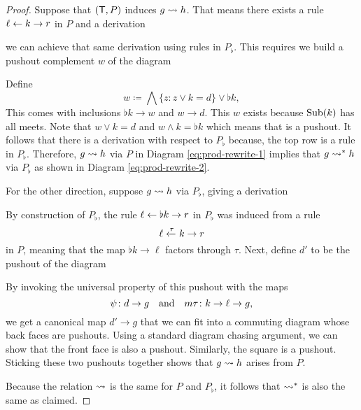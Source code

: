 \documentclass{amsart}
\begin{document}
\begin{proof}
  Suppose that $ ( \mathsf{T},P ) $ induces $ g \rightsquigarrow h $. That
  means there exists a rule $ \ell \leftarrow k \to r $ in $ P $
  and a derivation 
  
  we can achieve that same derivation using rules in
  $ P_\flat $. This requires we build a pushout complement
  $ w $ of the diagram 

  Define
  \[ w \coloneqq \bigwedge \{ z \colon z \vee k = d \} \vee
    \flat k,\] This comes with inclusions $ \flat k \to w $
  and $ w \to d $. This $ w $ exists because $ \operatorname{Sub} (k) $
  has all meets.  Note that $ w \vee k = d $ and
  $ w \wedge k = \flat k $ which means that
   is a pushout. It
  follows that there is a derivation
   with respect to
  $ P_\flat $ because, the top row is a rule in $ P_\flat $.
  Therefore, $ g \rightsquigarrow h $ via $ P $ in Diagram
  \eqref{eq:prod-rewrite-1} implies that $ g \rightsquigarrow^\ast h $
  via $ P_\flat $ as shown in Diagram
  \eqref{eq:prod-rewrite-2}.

  For the other direction, suppose $ g \rightsquigarrow h $ via
  $ P_\flat $, giving a derivation
  

  By construction of $ P_\flat $, the rule
  $ \ell \leftarrow \flat k \to r $ in $ P_\flat $ was induced from
  a rule $$\ell \xleftarrow{\tau} k \to r$$ in $ P $, meaning
  that the map $ \flat k \to \ell $ factors through
  $ \tau $. Next, define $ d' $ to be the pushout of the
  diagram 

  By invoking the universal property of this pushout with
  the maps
  \[
    \psi \colon d \to g \quad \text{and} \quad m \tau \colon k
    \to \ell \to g,
  \]
  we get a canonical map $ d' \to g $ that we can fit into a
  commuting diagram 
  whose back faces are pushouts. Using a standard diagram
  chasing argument, we can show that the front face is also
  a pushout.  Similarly, the square
   is a pushout.  Sticking
  these two pushouts together
   shows that
  $ g \rightsquigarrow h $ arises from $ P $.

  Because the relation $ \rightsquigarrow $ is the same for $ P $
  and $ P_\flat $, it follows that $ \rightsquigarrow^\ast $ is also
  the same as claimed.
\end{proof}
\end{document}
